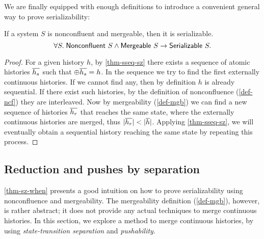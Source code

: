 We are finally equipped with enough definitions to introduce a convenient general way to prove serializability:
\begin{theorem}
  If a system $S$ is nonconfluent and mergeable, then it is serializable.
  \begin{displaymath}
    \forall S.\; \mathsf{Nonconfluent}\ S \land \mathsf{Mergeable}\ S \to \mathsf{Serializable}\ S.
  \end{displaymath}
  \vspace{-15pt}
  \label{thm-sz-when}
\end{theorem}
\begin{proof}
  For a given history $h$, by \autoref{thm-sseq-sz} there exists a sequence of atomic histories $\overline{h_s}$ such that $\oplus \overline{h_s} = h$.
  In the sequence we try to find the first externally continuous histories.
  If we cannot find any, then by definition $h$ is already sequential.
  If there exist such histories, by the definition of nonconfluence (\autoref{def-ncf}) they are interleaved.
  Now by mergeability (\autoref{def-mgb}) we can find a new sequence of histories $\overline{h_r}$ that reaches the same state, where the externally continuous histories are merged, thus $| \overline{h_r} | < | \overline{h} |$.
  Applying \autoref{thm-sseq-sz}, we will eventually obtain a sequential history reaching the same state by repeating this process.
\end{proof}

\subsection{Reduction and pushes by separation}
\label{sec-red-pushes}

\newcommand{\aobjs}[1]{\ensuremath{\mathsf{objs}\,(#1)}}
\newcommand{\achns}[1]{\ensuremath{\mathsf{chns}\,(#1)}}
\newcommand{\ainputs}[1]{\ensuremath{\mathsf{ins}\,(#1)}}
\newcommand{\aoutputs}[1]{\ensuremath{\mathsf{outs}\,(#1)}}
\newcommand{\ainits}[1]{\ensuremath{\mathsf{inits}\,(#1)}}
\newcommand{\alives}[1]{\ensuremath{\mathsf{lives}\,(#1)}}
\newcommand{\objsep}[2]{\ensuremath{\mathsf{ObjSep}\ #1\ #2}}
\newcommand{\objseph}[2]{\ensuremath{\mathsf{ObjSepHst}\ #1\ #2}}
\newcommand{\msgseph}[2]{\ensuremath{\mathsf{MsgSepHst}\ #1\ #2}}
\newcommand{\stseph}[2]{\ensuremath{\mathsf{SepHst}\ #1\ #2}}

\autoref{thm-sz-when} presents a good intuition on how to prove serializability using nonconfluence and mergeability.
The mergeability definition (\autoref{def-mgb}), however, is rather abstract; it does not provide any actual techniques to merge continuous histories.
In this section, we explore a method to merge continuous histories, by using \emph{state-transition separation} and \emph{pushability}.

